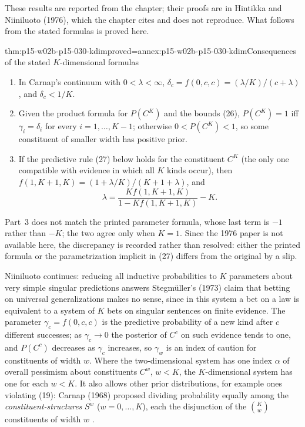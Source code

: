 These results are reported from the chapter; their proofs are in
Hintikka and Niiniluoto (1976), which the chapter cites and does not
reproduce. What follows from the stated formulas is proved here.

\begin{hbtheorem}{thm:p15-w02b-p15-030-kdim}{proved=annex:p15-w02b-p15-030-kdim}{Consequences of the stated \(K\)-dimensional formulas}
\begin{enumerate}
\item In Carnap's continuum with \(0<\lambda<\infty\),
  \(\delta_c=f(0,c,c)=(\lambda/K)/(c+\lambda)\), and \(\delta_c<1/K\).
\item Given the product formula for \(P(C^K)\) and the bounds (26),
  \(P(C^K)=1\) iff \(\gamma_i=\delta_i\) for every \(i=1,\ldots,K-1\);
  otherwise \(0<P(C^K)<1\), so some constituent of smaller width has
  positive prior.
\item If the predictive rule (27) below holds for the constituent \(C^K\)
  (the only one compatible with evidence in which all \(K\) kinds occur),
  then \(f(1,K+1,K)=(1+\lambda/K)/(K+1+\lambda)\), and
  \[
   \lambda=\frac{Kf(1,K+1,K)}{1-Kf(1,K+1,K)}-K .
  \]
\end{enumerate}
\end{hbtheorem}

Part~3 does not match the printed parameter formula, whose last term is
\(-1\) rather than \(-K\); the two agree only when \(K=1\). Since the
1976 paper is not available here, the discrepancy is recorded rather than
resolved: either the printed formula or the parametrization implicit in
(27) differs from the original by a slip.

Niiniluoto continues: reducing all inductive probabilities to \(K\)
parameters about very simple singular predictions answers Stegmüller's
(1973) claim that betting on universal generalizations makes no sense,
since in this system a bet on a law is equivalent to a system of \(K\)
bets on singular sentences on finite evidence. The parameter
\(\gamma_c=f(0,c,c)\) is the predictive probability of a new kind after
\(c\) different successes; as \(\gamma_c\to0\) the posterior of \(C^c\) on
such evidence tends to one, and \(P(C^c)\) decreases as \(\gamma_c\)
increases, so \(\gamma_w\) is an index of caution for constituents of
width \(w\). Where the two-dimensional system has one index \(\alpha\) of
overall pessimism about constituents \(C^w\), \(w<K\), the
\(K\)-dimensional system has one for each \(w<K\). It also allows other
prior distributions, for example ones violating (19): Carnap (1968)
proposed dividing probability equally among the
\emph{constituent-structures} \(S^w\) (\(w=0,\ldots,K\)), each the
disjunction of the \(\binom Kw\) constituents of width \(w\)
\cite[pp.~324--325]{Niiniluoto2011HintikkaProgramReading}.

